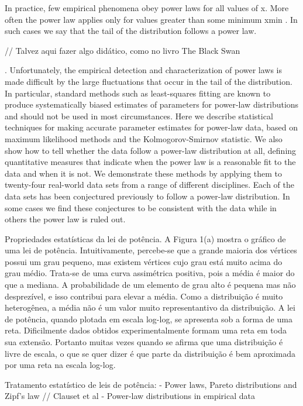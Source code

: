 \documentclass{article}
\begin{document}
    In practice, few empirical phenomena obey power laws for all values of x. More
often the power law applies only for values greater than some minimum xmin . In such
cases we say that the tail of the distribution follows a power law.


// Talvez aqui fazer algo didático, como no livro The Black Swan

. Unfortunately, the empirical detection and characterization of power laws is made difficult by the large fluctuations that occur in the tail of the distribution. In particular, standard methods such as least-squares fitting are known to produce systematically biased estimates of parameters for power-law distributions and should not be used in most circumstances. Here we describe statistical techniques for making accurate parameter estimates for power-law data, based on maximum likelihood methods and the Kolmogorov-Smirnov statistic. We also show how to tell whether the data follow a power-law distribution at all, defining quantitative measures that indicate when the power law is a reasonable fit to the data and when it is not. We demonstrate these methods by applying them to twenty-four real-world data sets from a range of different disciplines. Each of the data sets has been conjectured previously to follow a power-law distribution. In some cases we find these conjectures to be consistent with the data while in others the power law is ruled out.

Propriedades estatísticas da lei de potência. A Figura 1(a) mostra o gráfico de uma lei de potência. Intuitivamente, percebe-se que a grande maioria dos vértices possui um grau pequeno, mas existem vértices cujo grau está muito acima do grau médio. Trata-se de uma curva assimétrica positiva, pois a média é maior do que a mediana. A probabilidade de um elemento de grau alto é pequena mas não desprezível, e isso contribui para elevar a média. Como a distribuição é muito heterogênea, a média não é um valor muito representantivo da distribuição. A lei de potência, quando plotada em escala log-log, se apresenta sob a forma de uma reta. Dificilmente dados obtidos experimentalmente formam uma reta em toda sua extensão. Portanto muitas vezes quando se afirma que uma distribuição é livre de escala, o que se quer dizer é que parte da distribuição é bem aproximada por uma reta na escala log-log.

Tratamento estatístico de leis de potência:  \cite{Newman2005} - Power laws, Pareto distributions and Zipf's law   //   Clauset et al - Power-law distributions in empirical data \cite{Clauset2007}
\end{document}
